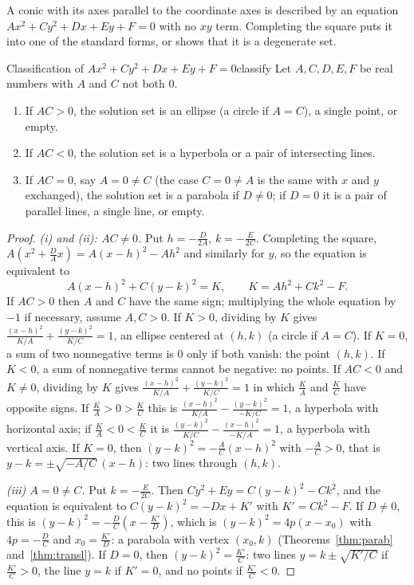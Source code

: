 \documentclass[11pt]{article}
\begin{document}
A conic with its axes parallel to the coordinate axes is described by an equation $Ax^2+Cy^2+Dx+Ey+F=0$ with no $xy$ term. Completing the square puts it into one of the standard forms, or shows that it is a degenerate set.

\begin{thm}{Classification of $Ax^2+Cy^2+Dx+Ey+F=0$}{classify}
Let $A,C,D,E,F$ be real numbers with $A$ and $C$ not both $0$.
\begin{enumerate}[label=(\roman*)]
  \item If $AC>0$, the solution set is an ellipse (a circle if $A=C$), a single point, or empty.
  \item If $AC<0$, the solution set is a hyperbola or a pair of intersecting lines.
  \item If $AC=0$, say $A=0\ne C$ (the case $C=0\ne A$ is the same with $x$ and $y$ exchanged), the solution set is a parabola if $D\ne0$; if $D=0$ it is a pair of parallel lines, a single line, or empty.
\end{enumerate}
\end{thm}
\begin{proof}
\emph{(i) and (ii): $AC\ne0$.} Put $h=-\frac D{2A}$, $k=-\frac E{2C}$. Completing the square, $A\left(x^2+\frac DAx\right)=A(x-h)^2-Ah^2$ and similarly for $y$, so the equation is equivalent to
\[
A(x-h)^2+C(y-k)^2=K,\qquad K=Ah^2+Ck^2-F .
\]
If $AC>0$ then $A$ and $C$ have the same sign; multiplying the whole equation by $-1$ if necessary, assume $A,C>0$. If $K>0$, dividing by $K$ gives $\frac{(x-h)^2}{K/A}+\frac{(y-k)^2}{K/C}=1$, an ellipse centered at $(h,k)$ (a circle if $A=C$). If $K=0$, a sum of two nonnegative terms is $0$ only if both vanish: the point $(h,k)$. If $K<0$, a sum of nonnegative terms cannot be negative: no points. If $AC<0$ and $K\ne0$, dividing by $K$ gives $\frac{(x-h)^2}{K/A}+\frac{(y-k)^2}{K/C}=1$ in which $\frac KA$ and $\frac KC$ have opposite signs. If $\frac KA>0>\frac KC$ this is $\frac{(x-h)^2}{K/A}-\frac{(y-k)^2}{-K/C}=1$, a hyperbola with horizontal axis; if $\frac KA<0<\frac KC$ it is $\frac{(y-k)^2}{K/C}-\frac{(x-h)^2}{-K/A}=1$, a hyperbola with vertical axis. If $K=0$, then $(y-k)^2=-\frac AC(x-h)^2$ with $-\frac AC>0$, that is $y-k=\pm\sqrt{-A/C}\,(x-h)$: two lines through $(h,k)$.

\emph{(iii) $A=0\ne C$.} Put $k=-\frac E{2C}$. Then $Cy^2+Ey=C(y-k)^2-Ck^2$, and the equation is equivalent to $C(y-k)^2=-Dx+K'$ with $K'=Ck^2-F$. If $D\ne0$, this is $(y-k)^2=-\frac DC\left(x-\frac{K'}D\right)$, which is $(y-k)^2=4p(x-x_0)$ with $4p=-\frac DC$ and $x_0=\frac{K'}D$: a parabola with vertex $(x_0,k)$ (Theorems~\ref{thm:parab} and~\ref{thm:transl}). If $D=0$, then $(y-k)^2=\frac{K'}C$: two lines $y=k\pm\sqrt{K'/C}$ if $\frac{K'}C>0$, the line $y=k$ if $K'=0$, and no points if $\frac{K'}C<0$.
\end{proof}
\end{document}
